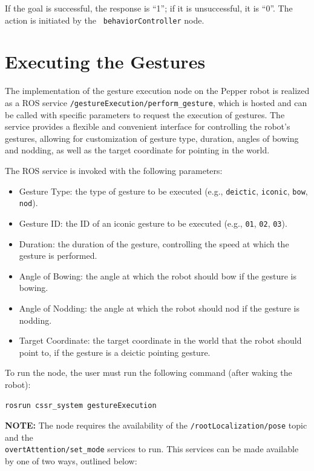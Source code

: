 \documentclass{CSSRforAfrica}
\begin{document}
If the goal is successful, the response is “1”; if it is unsuccessful, it is “0”. The action is initiated by the \texttt{ behaviorController} node.

\newpage
\section{Executing the Gestures}
The implementation of the gesture execution node on the Pepper robot is realized as a ROS service \texttt{/gestureExecution/perform\_gesture}, which is hosted and can be called with specific parameters to request the execution of gestures. The service provides a flexible and convenient interface for controlling the robot's gestures, allowing for customization of gesture type, duration, angles of bowing and nodding, as well as the target coordinate for pointing in the world.

The ROS service is invoked with the following parameters:
\begin{itemize}
	\item Gesture Type: the type of gesture to be executed (e.g., \texttt{deictic}, \texttt{iconic}, \texttt{bow}, \texttt{nod}).
	\item Gesture ID: the ID of an iconic gesture to be executed (e.g., \texttt{01}, \texttt{02}, \texttt{03}).
	\item Duration: the duration of the gesture, controlling the speed at which the gesture is performed.
	\item Angle of Bowing: the angle at which the robot should bow if the gesture is bowing.
	\item Angle of Nodding: the angle at which the robot should nod if the gesture is nodding.
	\item Target Coordinate: the target coordinate in the world that the robot should point to, if the gesture is a deictic pointing gesture.
\end{itemize}

\noindent To run the node, the user must run the following command (after waking the robot):


\begin{lstlisting}[style=withoutNumbering, language=bash]
rosrun cssr_system gestureExecution
\end{lstlisting}

{\color{red} 
\noindent \textbf{NOTE:} 
}
The node requires the availability of the \texttt{/rootLocalization/pose} topic and the \\ \texttt{overtAttention/set\_mode} services to run. This services can be made available by one of two ways, outlined below:
\end{document}
